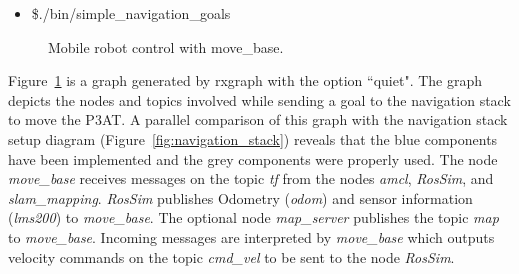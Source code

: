 \begin{itemize}
\item[]\$./bin/simple\_navigation\_goals
\end{itemize}


\begin{figure}[t!]
\centering
{}
\caption{\label{fig:movebase}Mobile robot control with move\_base.}
\end{figure}
      


Figure~\ref{fig:movebase} is a graph generated by rxgraph with the option ``quiet". The graph depicts the nodes and topics involved while sending a goal to  the navigation stack to move the P3AT. A parallel comparison of this graph with the navigation stack setup diagram (Figure~\ref{fig:navigation_stack}) reveals that the blue components have been implemented and the grey components were properly used. The node {\it move\_base} receives messages on the topic {\it tf} from the nodes {\it amcl}, {\it RosSim}, and {\it slam\_mapping}. {\it RosSim} publishes Odometry ({\it odom}) and sensor information ({\it lms200}) to {\it move\_base}. The optional node {\it map\_server} publishes the topic {\it map} to {\it move\_base}. Incoming messages are interpreted by {\it move\_base} which outputs velocity commands on the topic {\it cmd\_vel} to be sent to the node {\it RosSim}.
